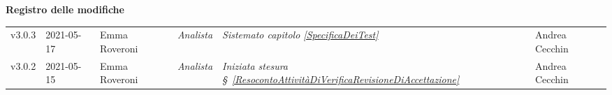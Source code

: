 \quad
\begin{center}
	\LARGE\textbf{Registro delle modifiche}
\end{center}

\def\tabularxcolumn#1{m{#1}}
{
\begin{center}
	\renewcommand{\arraystretch}{1.4}
	\begin{longtable}[c]{|p{2cm-1\tabcolsep}|p{2cm}|p{}|p{}|p{}|p{4cm-2\tabcolsep}|}
		\hline
		\rowcolor{airforceblue}
		\makecell[tc]{\textbf{Versione}} & \makecell[tc]{\textbf{Data}} & \makecell[tc]{\textbf{Autore}} & \makecell[tc]{\textbf{Ruolo}} & \makecell[tc]{\textbf{Modifica}} & \makecell[tc]{\textbf{Verificatore}}\\
		\hline
		\centering v3.0.3 & 2021-05-17 & Emma Roveroni & \centering\textit{Analista}  &  \textit{ Sistemato capitolo \ref{SpecificaDeiTest}} & Andrea Cecchin \\
		\hline
		\centering v3.0.2 & 2021-05-15 & Emma Roveroni & \centering\textit{Analista}  &  \textit{Iniziata stesura \S~\ref{ResocontoAttivitàDiVerificaRevisioneDiAccettazione}} & Andrea Cecchin \\
		\hline
		

\end{longtable}
\end{center}}
